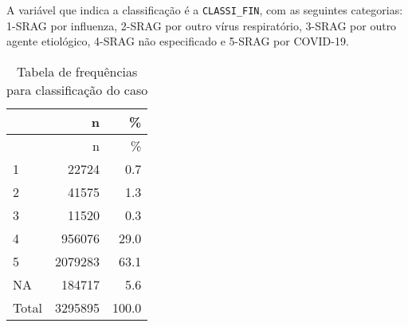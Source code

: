 \documentclass[
]{article}
\newenvironment{Shaded}{\begin{snugshade}}{\end{snugshade}}
\newcommand{\AttributeTok}[1]{\textcolor[rgb]{0.77,0.63,0.00}{#1}}
\newcommand{\CommentTok}[1]{\textcolor[rgb]{0.56,0.35,0.01}{\textit{#1}}}
\newcommand{\ConstantTok}[1]{\textcolor[rgb]{0.00,0.00,0.00}{#1}}
\newcommand{\DecValTok}[1]{\textcolor[rgb]{0.00,0.00,0.81}{#1}}
\newcommand{\FunctionTok}[1]{\textcolor[rgb]{0.00,0.00,0.00}{#1}}
\newcommand{\NormalTok}[1]{#1}
\newcommand{\OtherTok}[1]{\textcolor[rgb]{0.56,0.35,0.01}{#1}}
\newcommand{\SpecialCharTok}[1]{\textcolor[rgb]{0.00,0.00,0.00}{#1}}
\newcommand{\StringTok}[1]{\textcolor[rgb]{0.31,0.60,0.02}{#1}}
\begin{document}
A variável que indica a classificação é a \texttt{CLASSI\_FIN}, com as
seguintes categorias: 1-SRAG por influenza, 2-SRAG por outro vírus
respiratório, 3-SRAG por outro agente etiológico, 4-SRAG não
especificado e 5-SRAG por COVID-19.

\begin{Shaded}
\end{Shaded}

\begin{longtable}[]{@{}lrr@{}}
\caption{Tabela de frequências para classificação do
caso}\tabularnewline
\toprule
& n & \% \\
\midrule
\endfirsthead
\toprule
& n & \% \\
\midrule
\endhead
1 & 22724 & 0.7 \\
2 & 41575 & 1.3 \\
3 & 11520 & 0.3 \\
4 & 956076 & 29.0 \\
5 & 2079283 & 63.1 \\
NA & 184717 & 5.6 \\
Total & 3295895 & 100.0 \\
\bottomrule
\end{longtable}

\begin{Shaded}
\end{Shaded}
\end{document}
